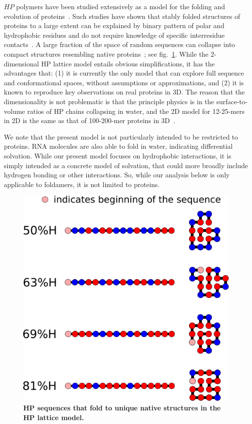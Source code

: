 \documentclass[journal=jacsat,manuscript=article,layout=twocolumn]{achemso}
\begin{document}
 $HP$ polymers have been studied extensively as a model for the folding and evolution of 
 proteins~\cite{lau1989lattice,Chan1991,Miller1995,Yue1995,agarwala1997local}.  Such studies have 
shown that stably folded structures of proteins to a large extent can be explained by binary 
pattern 
of polar and hydrophobic residues and do not require knowledge of specific interresidue 
contacts~\cite{Yue1992,Xiong1995,Fisher2011}. A large fraction of the space of random sequences 
can 
collapse into compact structures resembling native proteins~\cite{lau1989lattice}; see 
fig.~\ref{fig:hydro-effect}.  While the 2-dimensional HP lattice model entails obvious 
simplifications, it has the advantages that: (1) it is currently the only model that can explore 
full sequence and conformational spaces, without assumptions or approximations, and (2) it is 
known 
to reproduce key observations on real proteins in 3D.  The reason that the dimensionality is not 
problematic is that the principle physics is in the surface-to-volume ratios of HP chains 
collapsing 
in water, and the 2D model for 12-25-mers in 2D is the same as that of 100-200-mer proteins in 
3D~\cite{Giugliarelli2000}. 
 
  We note that the present model is not particularly intended to be restricted to proteins.  
  RNA molecules are also able to fold in water, indicating differential solvation.  While our 
present model focuses on hydrophobic interactions, it is simply intended as a concrete model of 
solvation, that could more broadly include hydrogen bonding or other interactions.  So, while our 
analysis below is only applicable to foldamers, it is not limited to proteins.
 

\begin{figure}[h!]
  \centering
  \includegraphics[width=\columnwidth]{pictures/tst-seqs.pdf} 
  \caption{\footnotesize{\textbf{HP sequences that fold to unique native structures in the HP 
lattice model.}}}
  \label{fig:hydro-effect}
\end{figure}
\end{document}
